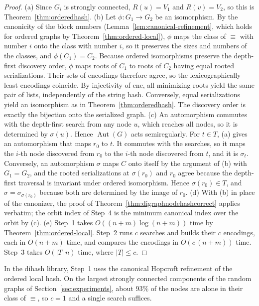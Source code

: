 \documentclass[twoside,leqno]{article}
\DeclareMathOperator{\Aut}{Aut}
\newcommand{\enc}{\mathrm{enc}}
\newcommand{\Reach}{R}
\begin{document}
\begin{proof}
(a) Since $G_i$ is strongly connected, $\Reach(u)=V_1$ and $\Reach(v)=V_2$, so this is Theorem~\ref{thm:orderedhash}.
(b) Let $\phi : G_1 \to G_2$ be an isomorphism. By the canonicity of the block numbers (Lemma~\ref{lem:canonical-refinement}, which holds for ordered graphs by Theorem~\ref{thm:ordered-local}), $\phi$ maps the class of $\equiv$ with number $i$ onto the class with number $i$, so it preserves the sizes and numbers of the classes, and $\phi(C_1)=C_2$. Because ordered isomorphisms preserve the depth-first discovery order, $\phi$ maps roots of $C_1$ to roots of $C_2$ having equal rooted serializations. Their sets of encodings therefore agree, so the lexicographically least encodings coincide. By injectivity of $\enc$, all minimizing roots yield the same pair of lists, independently of the string hash. Conversely, equal serializations yield an isomorphism as in Theorem~\ref{thm:orderedhash}. The discovery order is exactly the bijection onto the serialized graph.
(c) An automorphism commutes with the depth-first search from any node $u$, which reaches all nodes, so it is determined by $\sigma(u)$. Hence $\Aut(G)$ acts semiregularly. For $t\in T$, (a) gives an automorphism that maps $r_0$ to $t$. It commutes with the searches, so it maps the $i$-th node discovered from $r_0$ to the $i$-th node discovered from $t$, and it is $\sigma_t$. Conversely, an automorphism $\sigma$ maps $C$ onto itself by the argument of (b) with $G_1=G_2$, and the rooted serializations at $\sigma(r_0)$ and $r_0$ agree because the depth-first traversal is invariant under ordered isomorphism. Hence $\sigma(r_0)\in T$, and $\sigma=\sigma_{\sigma(r_0)}$ because both are determined by the image of $r_0$.
(d) With (b) in place of the canonizer, the proof of Theorem~\ref{thm:digraphnodehashcorrect} applies verbatim; the orbit index of Step~4 is the minimum canonical index over the orbit by (c).
(e) Step~1 takes $O((n+m)\log(n+m))$ time by Theorem~\ref{thm:ordered-local}. Step~2 runs $c$ searches and builds their $c$ encodings, each in $O(n+m)$ time, and compares the encodings in $O(c\,(n+m))$ time. Step~3 takes $O(|T|\,n)$ time, where $|T|\le c$.
\end{proof}

In the dihash library, Step~1 uses the canonical Hopcroft refinement of the ordered local hash. On the largest strongly connected components of the random graphs of Section~\ref{sec:experiments}, about $93\%$ of the nodes are alone in their class of $\equiv$, so $c=1$ and a single search suffices.
\end{document}

